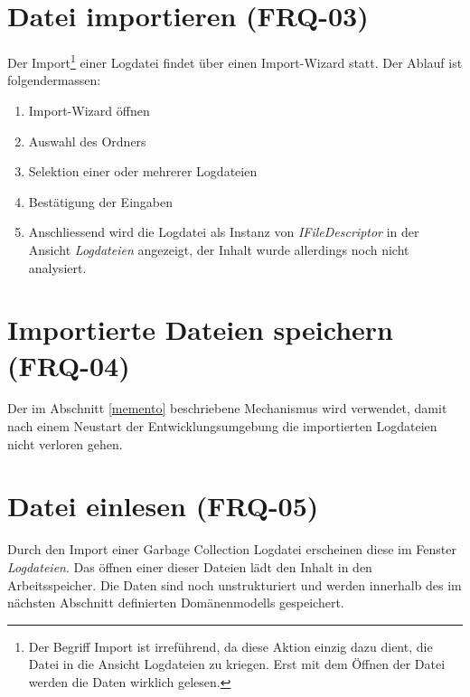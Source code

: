 \section{Datei importieren (FRQ-03)}
Der Import\footnote{Der Begriff Import ist irreführend, da diese Aktion einzig dazu dient, die Datei in die Ansicht Logdateien zu kriegen. Erst mit dem Öffnen der Datei werden die Daten wirklich gelesen.} einer Logdatei findet über einen Import-Wizard statt. Der Ablauf ist folgendermassen:
\begin{enumerate}
	\item Import-Wizard öffnen
	\item Auswahl des Ordners
	\item Selektion einer oder mehrerer Logdateien
	\item Bestätigung der Eingaben
	\item Anschliessend wird die Logdatei als Instanz von \textit{IFileDescriptor} in der Ansicht \textit{Logdateien} angezeigt, der Inhalt wurde allerdings noch nicht analysiert.
\end{enumerate}

\section{Importierte Dateien speichern (FRQ-04)}
Der im Abschnitt \ref{memento} beschriebene Mechanismus wird verwendet, damit nach einem Neustart der Entwicklungsumgebung die importierten Logdateien nicht verloren gehen. 

\section{Datei einlesen (FRQ-05)}
Durch den Import einer Garbage Collection Logdatei erscheinen diese im Fenster \textit{Logdateien}. Das öffnen einer dieser Dateien lädt den Inhalt in den Arbeitsspeicher. Die Daten sind noch unstrukturiert und werden innerhalb des im nächsten Abschnitt definierten Domänenmodells gespeichert.

